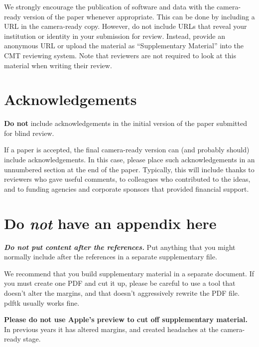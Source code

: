 \documentclass{article}
\begin{document}
We strongly encourage the publication of software and data with the
camera-ready version of the paper whenever appropriate. This can be
done by including a URL in the camera-ready copy. However, do not
include URLs that reveal your institution or identity in your
submission for review. Instead, provide an anonymous URL or upload
the material as ``Supplementary Material'' into the CMT reviewing
system. Note that reviewers are not required to look at this material
when writing their review.

\section*{Acknowledgements}

\textbf{Do not} include acknowledgements in the initial version of
the paper submitted for blind review.

If a paper is accepted, the final camera-ready version can (and
probably should) include acknowledgements. In this case, please
place such acknowledgements in an unnumbered section at the
end of the paper. Typically, this will include thanks to reviewers
who gave useful comments, to colleagues who contributed to the ideas,
and to funding agencies and corporate sponsors that provided financial
support.


\nocite{langley00}





\appendix
\section{Do \emph{not} have an appendix here}

\textbf{\emph{Do not put content after the references.}}
%
Put anything that you might normally include after the references in a separate
supplementary file.

We recommend that you build supplementary material in a separate document.
If you must create one PDF and cut it up, please be careful to use a tool that
doesn't alter the margins, and that doesn't aggressively rewrite the PDF file.
pdftk usually works fine. 

\textbf{Please do not use Apple's preview to cut off supplementary material.} In
previous years it has altered margins, and created headaches at the camera-ready
stage. 
\end{document}
